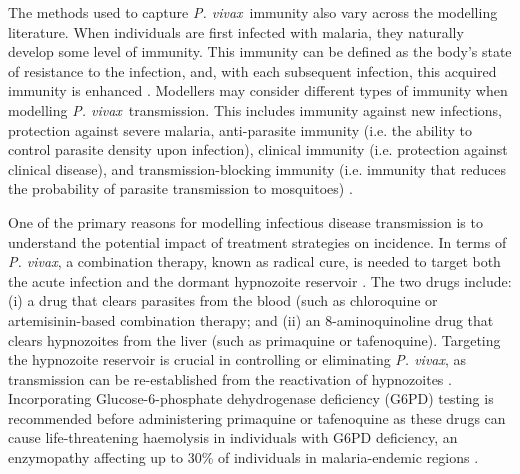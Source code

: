 \documentclass[12pt]{article}
\newcommand{\pv}{\textit{P. vivax}}
\begin{document}
The methods used to capture \pv~immunity also vary across the modelling literature. When individuals are first infected with malaria, they naturally develop some level of immunity. This immunity can be defined as the body's state of resistance to the infection, and, with each subsequent infection, this acquired immunity is enhanced \cite{bruce1985essential}. Modellers may consider different types of immunity when modelling \pv~transmission. This includes immunity against new infections, protection against severe malaria, anti-parasite immunity (i.e. the ability to control parasite density upon infection), clinical immunity (i.e. protection against clinical disease), and transmission-blocking immunity (i.e. immunity that reduces the probability of parasite transmission to mosquitoes) \cite{de1988modulation,de1991mathematical,doolan2009acquired}.



One of the primary reasons for modelling infectious disease transmission is to understand the potential impact of treatment strategies on incidence. In terms of \pv, a combination therapy, known as radical cure, is needed to target both the acute infection and the dormant hypnozoite reservoir \cite{wells2010targeting,taylor2019short,poespoprodjo2022supervised}. The two drugs include: (i) a drug that clears parasites from the blood (such as chloroquine or artemisinin-based combination therapy; and (ii) an 8-aminoquinoline drug that clears hypnozoites from the liver (such as primaquine or tafenoquine). Targeting the hypnozoite reservoir is crucial in controlling or eliminating \pv, as transmission can be re-established from the reactivation of hypnozoites \cite{white2014modelling}. Incorporating Glucose-6-phosphate dehydrogenase deficiency (G6PD) testing is recommended before administering primaquine or tafenoquine as these drugs can cause life-threatening haemolysis in individuals with G6PD deficiency, an enzymopathy affecting up to 30\% of individuals in malaria-endemic regions \cite{recht2018use}. 
\end{document}
